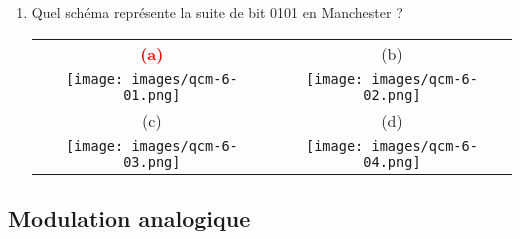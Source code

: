 \documentclass[a4paper]{article}
\begin{document}
\begin{enumerate}[label=Q\arabic*.]
\item Quel schéma représente la suite de bit 0101 en Manchester ?
\begin{center} \begin{tabular}{cc}
    \textcolor{red}{\textbf{(a)}} & (b) \\
    \texttt{[image: images/qcm-6-01.png]} &
    \texttt{[image: images/qcm-6-02.png]} \\
    (c) & (d) \\
    \texttt{[image: images/qcm-6-03.png]} &
    \texttt{[image: images/qcm-6-04.png]}
\end{tabular} \end{center}


\end{enumerate}










\subsection{Modulation analogique}
\end{document}
